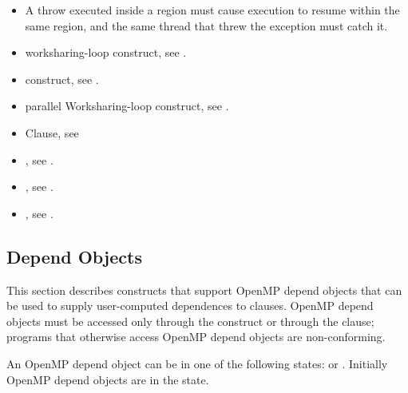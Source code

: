 \begin{cppspecific}
\begin{itemize}
\item A throw executed inside a  region must cause execution to
      resume within the same  region, and the same thread that threw
      the exception must catch it.
\end{itemize}
\end{cppspecific}

\crossreferences
\begin{itemize}
\item worksharing-loop construct, see
.

\item {} construct, see
.

\item parallel Worksharing-loop construct, see
.

\item {} Clause, see

\item {}, see
.

\item {}, see
.

\item {}, see
.
\end{itemize}



\subsection{Depend Objects}
\label{subsec:Depend Object}

This section describes constructs that support OpenMP depend objects that 
can be used to supply user-computed dependences to  clauses. 
OpenMP depend objects must be accessed only through the  
construct or through the  clause; programs that otherwise 
access OpenMP depend objects are non-conforming.

An OpenMP depend object can be in one of the following states: 
 or . Initially OpenMP depend objects 
are in the  state.


